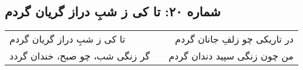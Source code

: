 \begin{center}
\section*{شماره ۲۰: تا کی ز شبِ دراز گریان گردم}
\label{sec:020}
\begin{longtable}{l p{0.5cm} r}
تا کی ز شبِ دراز گریان گردم
&&
در تاریکی چو زلفِ جانان گردم
\\
گر زنگی شب، چو صبح، خندان گردد
&&
من چون زنگی سپید دندان گردم
\\
\end{longtable}
\end{center}
